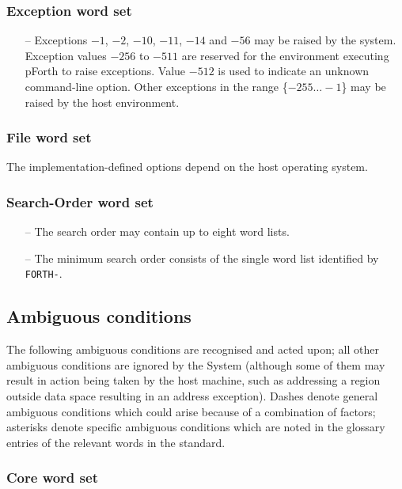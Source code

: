 \documentclass[english]{article}
\begin{document}
\subsubsection{Exception word set}

\begin{itemize}
\item[--]Exceptions $-1$, $-2$, $-10$, $-11$, $-14$ and $-56$ may be raised by the system. Exception values $-256$ to $-511$ are reserved for the environment executing pForth to raise exceptions. Value $-512$ is used to indicate an unknown command-line option. Other exceptions in the range \{$-255\dots -1$\} may be raised by the host environment.
\end{itemize}

\subsubsection{File word set}

The implementation-defined options depend on the host operating system.

\subsubsection{Search-Order word set}

\begin{itemize}
\item[--]The search order may contain up to eight word lists.
\item[--]The minimum search order consists of the single word list identified
by {\tt FORTH-}.
\end{itemize}


\subsection{Ambiguous conditions}

The following ambiguous conditions are recognised and acted upon; all other
ambiguous conditions are ignored by the System (although some of them may
result in action being taken by the host machine, such as addressing a region
outside data space resulting in an address exception). Dashes denote general
ambiguous conditions which could arise because of a combination of factors;
asterisks denote specific ambiguous conditions which are noted in the
glossary entries of the relevant words in the standard.

\subsubsection{Core word set}
\end{document}
